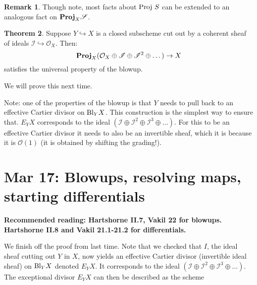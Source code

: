\documentclass[10pt,reqno]{amsart}
\theoremstyle{definition}
\newtheorem{theorem}{Theorem}
\newtheorem{remark}[theorem]{Remark}
\theoremstyle{remark}
\numberwithin{equation}{section}
\numberwithin{theorem}{section}
\newcommand{\OO}{{\mathcal O}}
\newcommand{\proj}{\textup{Proj }}
\newcommand{\bproj}{\textbf{\textup{Proj}}}
\newcommand{\SSS}{{\mathscr S}}
\newcommand{\II}{{\mathscr I}}
\newcommand{\Bl}{\textup{Bl}}
\begin{document}
\begin{remark} Though note, most facts about $\proj S$ can be extended to an analogous fact on $\bproj_X \SSS$.
\end{remark}

\begin{theorem}\label{theorem:blowup-univ} Suppose $Y \hookrightarrow X$ is a closed subscheme cut out by a coherent sheaf of ideals $\II \hookrightarrow \OO_X$. Then:
\[\bproj_X (\OO_X \oplus \II \oplus \II^2 \oplus \dots) \to X\]
satisfies the universal property of the blowup.
\end{theorem}

We will prove this next time. 

Note: one of the properties of the blowup is that $Y$ needs to pull back to an effective Cartier divisor on $\Bl_Y X$. This construction is the simplest way to ensure that. $E_Y X$ corresponds to the ideal $(\II \oplus \II^2 \oplus \II^3 \oplus \dots)$. For this to be an effective Cartier divisor it needs to also be an invertible sheaf, which it is because it is $\OO(1)$ (it is obtained by shifting the grading!).

\section{Mar 17: Blowups, resolving maps, starting differentials}
\textbf{Recommended reading: Hartshorne II.7, Vakil 22 for blowups. Hartshorne II.8 and Vakil 21.1-21.2 for differentials.}

We finish off the proof from last time. Note that we checked that $I$, the ideal sheaf cutting out $Y$ in $X$, now yields an effective Cartier divisor (invertible ideal sheaf) on $\Bl_Y X$ denoted $E_Y X$. It corresponds to the ideal $(\II \oplus \II^2 \oplus \II^3 \oplus \dots)$. The exceptional divisor $E_Y X$ can then be described as the scheme
\end{document}
